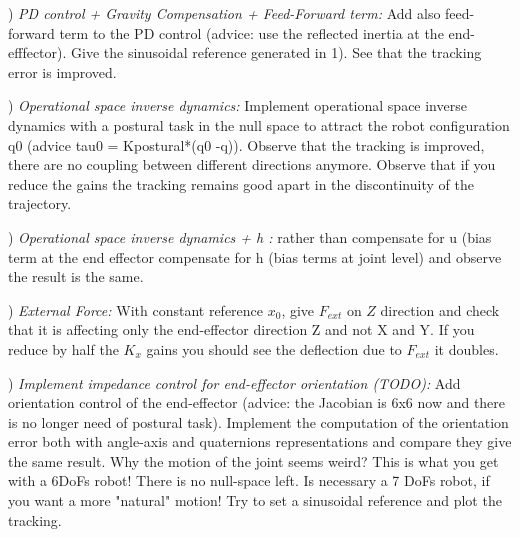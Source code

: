 \documentclass{report}
\begin{document}
\quad

) \textit{PD control  + Gravity Compensation + Feed-Forward term:}
Add also feed-forward term to the PD control (advice: use the reflected inertia at the end-efffector). Give the sinusoidal reference generated in 1). See that the tracking error is improved. 

\quad

) \textit{Operational space inverse dynamics:}
Implement operational space inverse dynamics with a postural task in the null space to attract the robot configuration q0 (advice tau0 = Kpostural*(q0 -q)).  Observe that the tracking is improved, there are no coupling between different directions anymore.  Observe that if you reduce the gains the tracking remains good apart in the discontinuity of the trajectory.  

\quad

) \textit{Operational space inverse dynamics + h :}
rather than compensate for u (bias term at the end effector  compensate for h (bias terms at joint level) and observe the result is the same.

\quad

) \textit{External Force:}
With constant reference $x_0$,  give $F_{ext}$ on $Z$ direction and check that it is affecting only the end-effector direction Z and not X and Y. If you reduce by half  the $K_x$ gains you should see the deflection due to $F_{ext}$ it doubles.

\quad

) \textit{Implement impedance control for end-effector orientation (TODO):}
Add orientation  control of the end-effector (advice: the Jacobian is 6x6 now and there is no longer need of postural task). Implement the computation of the orientation error both with angle-axis and quaternions representations and compare they give the same result.
Why the motion of the joint seems weird? This is what you get with a 6DoFs robot! There is no null-space left. Is necessary a 7 DoFs robot, if you want a more "natural" motion! Try to set a sinusoidal reference and plot the tracking.
 
\end{document}
